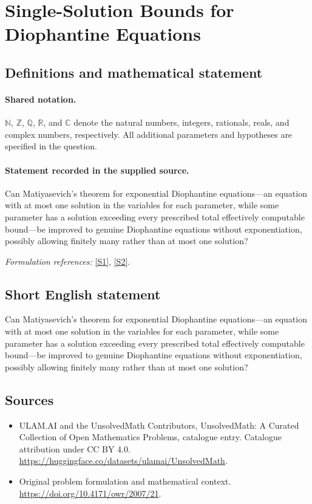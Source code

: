 \documentclass[11pt]{article}
\newcommand{\sref}[2]{\hyperlink{source:#1:#2}{[S#2]}}
\begin{document}
\section{Single-Solution Bounds for Diophantine Equations}\label{statement}

\subsection{Definitions and mathematical statement}

\paragraph{Shared notation.}$\mathbb N$, $\mathbb Z$, $\mathbb Q$, $\mathbb R$, and $\mathbb C$ denote the natural numbers, integers, rationals, reals, and complex numbers, respectively. All additional parameters and hypotheses are specified in the question.


\paragraph{Statement recorded in the supplied source.}
Can Matiyasevich’s theorem for exponential Diophantine equations—an equation with at most one solution in the variables for each parameter, while some parameter has a solution exceeding every prescribed total effectively computable bound—be improved to genuine Diophantine equations without exponentiation, possibly allowing finitely many rather than at most one solution?
\par\smallskip\textit{Formulation references:} \sref{statement}{1}, \sref{statement}{2}.
\subsection{Short English statement}
Can Matiyasevich’s theorem for exponential Diophantine equations—an equation with at most one solution in the variables for each parameter, while some parameter has a solution exceeding every prescribed total effectively computable bound—be improved to genuine Diophantine equations without exponentiation, possibly allowing finitely many rather than at most one solution?
\subsection{Sources}
\begin{itemize}
\item[\hypertarget{source:statement:1}{S1}] ULAM.AI and the UnsolvedMath Contributors, UnsolvedMath: A Curated Collection of Open Mathematics Problems, catalogue entry. Catalogue attribution under CC BY 4.0.
\url{https://huggingface.co/datasets/ulamai/UnsolvedMath}.
\item[\hypertarget{source:statement:2}{S2}] Original problem formulation and mathematical context.
\url{https://doi.org/10.4171/owr/2007/21}.
\end{itemize}
\label{end:statement}
\end{document}
